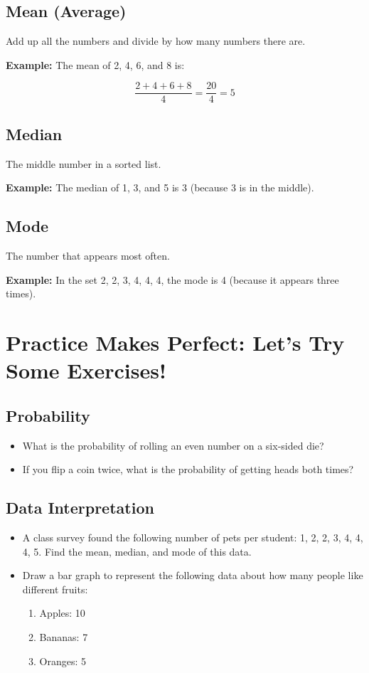 \subsection{Mean (Average)}
Add up all the numbers and divide by how many numbers there are.

\textbf{Example:} The mean of 2, 4, 6, and 8 is:

\[
\frac{2 + 4 + 6 + 8}{4} = \frac{20}{4} = 5
\]

\subsection{Median}
The middle number in a sorted list.

\textbf{Example:} The median of 1, 3, and 5 is 3 (because 3 is in the middle).

\subsection{Mode}
The number that appears most often.

\textbf{Example:} In the set 2, 2, 3, 4, 4, 4, the mode is 4 (because it appears three times).

\section{Practice Makes Perfect: Let’s Try Some Exercises!}
\subsection{Probability}
\begin{itemize}
    \item What is the probability of rolling an even number on a six-sided die?
    \item If you flip a coin twice, what is the probability of getting heads both times?
\end{itemize}

\subsection{Data Interpretation}
\begin{itemize}
    \item A class survey found the following number of pets per student: 1, 2, 2, 3, 4, 4, 4, 5. Find the mean, median, and mode of this data.
    \item Draw a bar graph to represent the following data about how many people like different fruits:
    \begin{enumerate}[label=(\alph*)]
        \item Apples: 10
        \item Bananas: 7
         \item Oranges: 5
    \end{enumerate}
\end{itemize}

